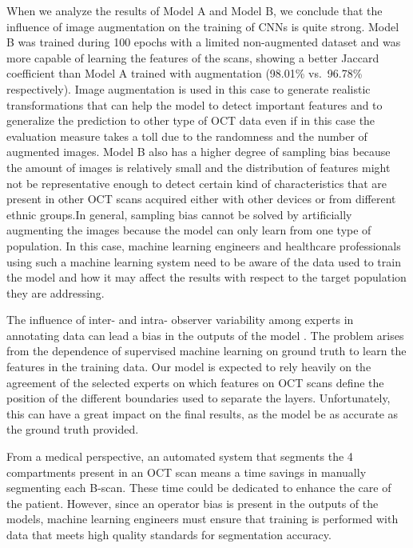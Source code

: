 \documentclass[12pt,a4paper]{scrartcl}
\begin{document}
When we analyze the results of Model A and Model B, we conclude that the influence of image augmentation on the training of CNNs is quite strong. Model B was trained during 100 epochs with a limited non-augmented dataset and was more capable of learning the features of the scans, showing a better Jaccard coefficient than Model A trained with augmentation (98.01\% vs.~96.78\% respectively). Image augmentation is used in this case to generate realistic transformations that can help the model to detect important features and to generalize the prediction to other type of OCT data even if in this case the evaluation measure takes a toll due to the randomness and the number of augmented images. Model B also has a higher degree of sampling bias because the amount of images is relatively small and the distribution of features might not be representative enough to detect certain kind of characteristics that are present in other OCT scans acquired either with other devices or from different ethnic groups.In general, sampling bias cannot be solved by artificially augmenting the images because the model can only learn from one type of population. In this case, machine learning engineers and healthcare professionals using such a machine learning system need to be aware of the data used to train the model and how it may affect the results with respect to the target population they are addressing.

The influence of inter- and intra- observer variability among experts in annotating data \cite{Maloca2019, Maloca2021, Ronchetti2019} can lead a bias in the outputs of the model \cite{Gabr2016}. The problem arises from the dependence of supervised machine learning on ground truth to learn the features in the training data. Our model is expected to rely heavily on the agreement of the selected experts on which features on OCT scans define the position of the different boundaries used to separate the layers. Unfortunately, this can have a great impact on the final results, as the model be as accurate as the ground truth provided.  

From a medical perspective, an automated system that segments the 4 compartments present in an OCT scan means a time savings in manually segmenting each B-scan. These time could be dedicated to enhance the care of the patient. However, since an operator bias is present in the outputs of the models, machine learning engineers must ensure that training is performed with data that meets high quality standards for segmentation accuracy.
\end{document}
